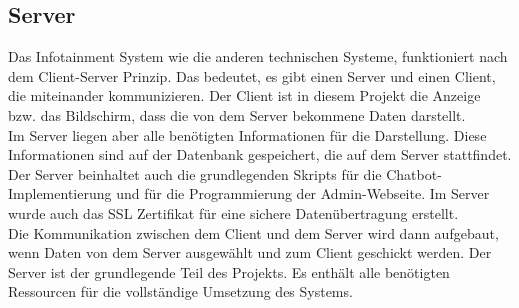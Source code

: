\subsection{Server}
Das Infotainment System wie die anderen technischen Systeme, funktioniert nach dem Client-Server Prinzip. Das bedeutet, es gibt einen Server und einen Client, die miteinander kommunizieren. Der Client ist in diesem Projekt die Anzeige bzw. das Bildschirm, dass die von dem Server bekommene Daten darstellt. \\
Im Server liegen aber alle benötigten Informationen für die Darstellung. Diese Informationen sind auf der Datenbank gespeichert, die auf dem Server stattfindet.\\
Der Server beinhaltet auch die grundlegenden Skripts für die Chatbot-Implementierung und für die Programmierung der Admin-Webseite. Im Server wurde auch das SSL Zertifikat für eine sichere Datenübertragung erstellt.\\
Die Kommunikation zwischen dem Client und dem Server wird dann aufgebaut, wenn Daten von dem Server ausgewählt und zum Client geschickt werden. 
Der Server ist der grundlegende Teil des Projekts. Es enthält alle benötigten Ressourcen für die vollständige Umsetzung des Systems.
